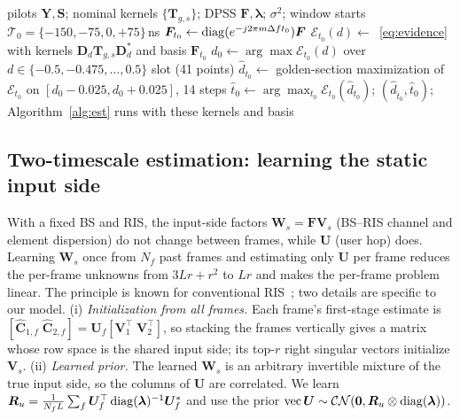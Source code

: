 \begin{algorithm}[!htbp]
\caption{Blind clock-offset and delay-reference estimation by evidence}\label{alg:offset}
\begin{algorithmic}[1]
\Require pilots $\bm Y,\bm S$; nominal kernels $\{\bm T_{g,s}\}$; DPSS $\bm F,\bm\lambda$; $\sigma^2$; window starts $\mathcal T_0=\{-150,-75,0,+75\}$\,ns
  \State $\bm F_{t_0}\gets\operatorname{diag}(e^{-j2\pi m\Delta f t_0})\bm F$ 
  \State $\mathcal E_{t_0}(d)\gets$~\eqref{eq:evidence} with kernels $\bm D_d\bm T_{g,s}\bm D_d^{*}$ and basis $\bm F_{t_0}$
  \State $d_0\gets\arg\max\mathcal E_{t_0}(d)$ over $d\in\{-0.5,-0.475,\dots,0.5\}$ slot (41 points)
  \State $\hat d_{t_0}\gets$ golden-section maximization of $\mathcal E_{t_0}$ on $[d_0-0.025,d_0+0.025]$, 14 steps
\EndFor
\State $\hat t_0\gets\arg\max_{t_0}\mathcal E_{t_0}(\hat d_{t_0})$; \Return $(\hat d_{\hat t_0},\hat t_0)$; Algorithm~\ref{alg:est} runs with these kernels and basis
\end{algorithmic}
\end{algorithm}

\subsection{Two-timescale estimation: learning the static input side}\label{sec:twoscale}
With a fixed BS and RIS, the input-side factors $\bm W_s=\bm F\bm V_s$ (BS--RIS channel and
element dispersion) do not change between frames, while $\bm U$ (user hop) does. Learning
$\bm W_s$ once from $N_f$ past frames and estimating only $\bm U$ per frame reduces the
per-frame unknowns from $3Lr+r^2$ to $Lr$ and makes the per-frame problem linear. The
principle is known for conventional RIS~\cite{hu2019twotimescale}; two details are specific
to our model. (i) \emph{Initialization from all frames.} Each frame's first-stage estimate is
$[\hat{\bm C}_{1,f}\;\hat{\bm C}_{2,f}]=\bm U_f[\bm V_1^{\top}\;\bm V_2^{\top}]$, so stacking the
frames vertically gives a matrix whose row space is the shared input side; its top-$r$ right
singular vectors initialize $\bm V_s$. (ii) \emph{Learned prior.} The learned $\bm W_s$ is an
arbitrary invertible mixture of the true input side, so the columns of $\bm U$ are correlated.
We learn $\bm R_u=\frac{1}{N_fL}\sum_f\bm U_f^{\top}\operatorname{diag}(\bm\lambda)^{-1}\bm U_f^{*}$ and use the
prior $\operatorname{vec}\bm U\sim\mathcal{CN}(\bm 0,\bm R_u\otimes\operatorname{diag}(\bm\lambda))$.

